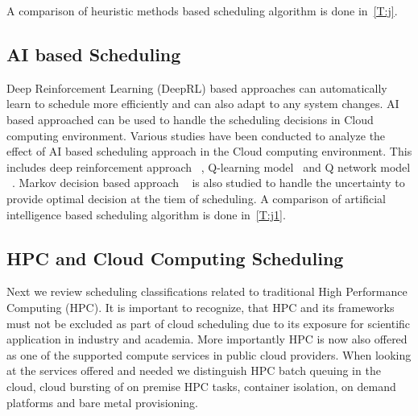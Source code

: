 \documentclass[final,5p,times,twocolumn]{elsarticle}
\begin{document}
A comparison of heuristic methods based scheduling
algorithm is done in~\ref{T:j}.






\subsection{AI based Scheduling}\label{sec:AI}

\color{red}

Deep Reinforcement Learning (DeepRL) based approaches can
automatically learn to schedule more efficiently and can also adapt to
any system changes. AI based approached can be used to handle the
scheduling decisions in Cloud computing environment. Various studies
have been conducted to analyze the effect of AI based scheduling
approach in the Cloud computing environment. This includes deep
reinforcement approach ~\cite{cheng2018drl,mao2018learning},
Q-learning model~\cite{zhang2017energy} and Q network model
~\cite{wang2019multi}. Markov decision based approach
~\cite{barrett2013applying} is also studied to handle the uncertainty
to provide optimal decision at the tiem of scheduling.  A comparison
of artificial intelligence based scheduling algorithm is done
in~\ref{T:j1}.

\color{black}



\subsection{HPC and Cloud Computing Scheduling}
\label{sec:hpc}


Next we review scheduling classifications related to traditional High
Performance Computing (HPC). It is important to recognize, that HPC
and its frameworks must not be excluded as part of cloud scheduling
due to its exposure for scientific application in industry and
academia. More importantly HPC is now also offered as one of the supported
compute services in public cloud providers. When looking at the services offered
and needed we distinguish HPC batch queuing in the cloud, cloud
bursting of on premise HPC tasks, container isolation, on demand
platforms and bare metal provisioning.
\end{document}
